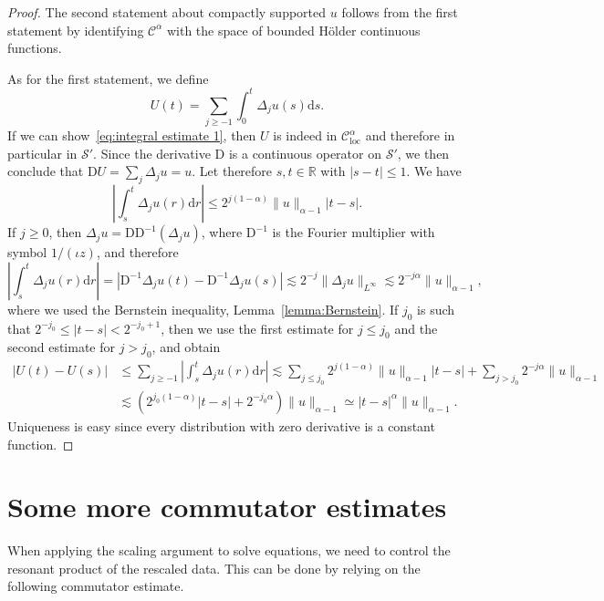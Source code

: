 \documentclass[11pt,a4paper]{article}
\newcommand{\mathD}{\mathrm{D}}
\newcommand{\mathd}{\mathrm{d}}
\newcommand{\tmop}[1]{\ensuremath{\operatorname{#1}}}
\theoremstyle{remark}
\newcommand{\CC}{\ensuremath{\mathscr{C}}}
\newcommand{\CS}{\ensuremath{\mathscr{S}}}
\begin{document}
\begin{proof}
  The second statement about compactly supported $u$ follows from the first statement by identifying $\CC^{\alpha}$ with the space of bounded H{\"o}lder continuous functions.
  
  As for the first statement, we define
  \[
     U ( t ) = \sum_{j \geqslant -1} \int_{0}^{t} \Delta_{j} u ( s ) \mathd s.
  \]
  If we can show~{\eqref{eq:integral estimate 1}}, then $U$ is indeed in $\CC^{\alpha}_{\tmop{loc}}$ and therefore in particular in $\CS'$. Since the derivative $\mathD$ is a continuous operator on $\CS'$, we then conclude that $\mathD U= \sum_{j} \Delta_{j} u=u$. Let therefore $s,t \in \mathbb{R}$ with $| s-t | \leqslant 1$. We have
  \[
     \left| \int_{s}^{t} \Delta_{j} u ( r ) \mathd r \right| \leqslant 2^{j (1- \alpha )} \| u \|_{\alpha -1} | t-s | .
  \]
  If $j \geqslant 0$, then $\Delta_{j} u= \mathD \mathD^{-1} ( \Delta_{j} u)$, where $\mathD^{-1}$ is the Fourier multiplier with symbol $1/ ( \iota  z )$, and therefore
  \[
     \left| \int_{s}^{t} \Delta_{j} u ( r ) \mathd r \right| = | \mathD^{-1} \Delta_{j} u ( t ) - \mathD^{-1} \Delta_{j} u ( s ) | \lesssim 2^{-j} \| \Delta_{j} u \|_{L^{\infty}} \lesssim 2^{-j \alpha} \| u \|_{\alpha -1} ,
  \]
  where we used the Bernstein inequality, Lemma~\ref{lemma:Bernstein}. If $j_{0}$ is such that $2^{-j_{0}} \leqslant | t-s | <2^{-j_{0} +1}$, then we use the first estimate for $j \leqslant j_{0}$ and the second estimate for $j>j_{0}$, and obtain
  \begin{align*}
     | U ( t ) -U ( s ) | &\leqslant \sum_{j \geqslant -1} \left| \int_{s}^{t} \Delta_{j} u ( r ) \mathd r \right| \lesssim \sum_{j \leqslant j_{0}} 2^{j ( 1- \alpha )} \| u \|_{\alpha -1} | t-s | + \sum_{j>j_{0}} 2^{-j \alpha} \| u \|_{\alpha -1} \\
     & \lesssim ( 2^{j_{0} ( 1- \alpha )} | t-s | +2^{-j_{0} \alpha} ) \| u \|_{\alpha -1} \simeq | t-s |^{\alpha} \| u \|_{\alpha -1} .
  \end{align*}
  Uniqueness is easy since every distribution with zero derivative is a constant function.
\end{proof}



\section{Some more commutator estimates}\label{sec:convolution commutators}

When applying the scaling argument to solve equations, we need to control the resonant product of the rescaled data. This can be done by relying on the following commutator estimate.
\end{document}
